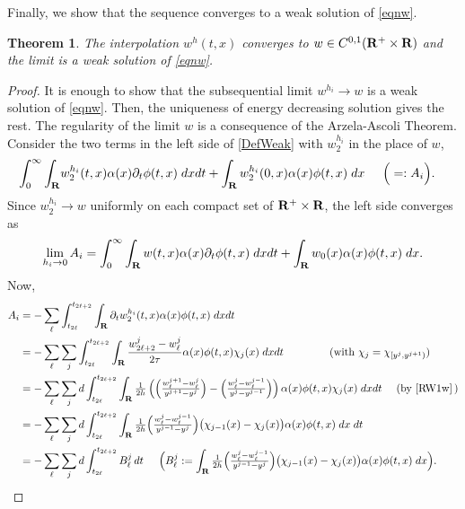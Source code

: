 \documentclass[11pt]{amsart}
\def\R{{\bf R}}
\def\R{\mathbb{R}}
\def\R{{\bf R}}
\newtheorem{theorem}{Theorem}[section]
\begin{document}
Finally, we show that the sequence converges to a weak solution of \eqref{eqnw}.
\begin{theorem}
  The interpolation $w^{h}(t,x)$ converges to $w\in C^{0,1}(\R^+\times\R)$ and the limit is a weak solution of \eqref{eqnw}.
\end{theorem}
\begin{proof}
It is enough to show that the subsequential limit $w^{h_i}\to w$ is a weak solution of \eqref{eqnw}. Then, the uniqueness of energy decreasing solution gives the rest. The regularity of the limit $w$ is a consequence of the Arzela-Ascoli Theorem. Consider the two terms in the left side of \eqref{DefWeak} with $w_2^{h_i}$ in the place of $w$,
\begin{align*}
 \int_0^\infty\int_\R& w_2^{h_i}(t,x) \alpha(x)\partial_t\phi(t,x)\; dx dt
 +\int_\R w_2^{h_i}(0,x)\alpha(x)\phi(t,x) \; dx\hskip 5mm \Big(=:A_i\Big).
\end{align*}
Since $w_2^{h_i} \rightarrow w$ uniformly on each compact set of $\R^+\times \R$, the left side converges as
\begin{align*}
\lim_{h_i\to0}A_i=\int_0^\infty\int_\R w(t,x) \alpha(x)\partial_t\phi(t,x)\; dx
dt+\int_\R w_0(x)\alpha(x)\phi(t,x) \; dx.
\end{align*}
Now,
\begin{align*}
 A_i&=-\sum_{\ell}\int_{t_{2\ell}}^{t_{2\ell+2}}\int_\R \partial_t
 w_2^{h_i}(t,x) \alpha(x)\phi(t,x)\; dx dt \\
 &=-\sum_{\ell}\sum_{j}\int_{t_{2\ell}}^{t_{2\ell+2}}\int_\R
 \frac{w^j_{2\ell+2}-w^j_{\ell}}{2\tau} \alpha(x) \phi(t,x) \chi_j(x)\; dx dt \hskip
 1.5cm (\text{with } \chi_j=\chi_{[y^j,y^{j+1})})\\
 &=-\sum_{\ell}\sum_{j}d\int_{t_{2\ell}}^{t_{2\ell+2}}\int_\R
 \tfrac{1}{2h} \left( \Big(\tfrac{w^{j+1}_{\ell} -
 w^{j}_{\ell}}{y^{j+1}-y^j}\Big) -\Big(\tfrac{w^{j}_{\ell} -
 w^{j-1}_{\ell}}{y^{j}-y^{j-1}} \Big)\right) \alpha(x) \phi(t,x) \chi_j(x)\; dx
 dt\quad\ (\text{by } \eqref{RW1w}\,)\\
 &=-\sum_{\ell}\sum_{j}d\int_{t_{2\ell}}^{t_{2\ell+2}}\int_\R
 \tfrac{1}{2h} \Big(\tfrac{w^{j}_{\ell} -
 w^{j-1}_{\ell}}{y^{j-1}-y^j}\Big)
 \big(\chi_{j-1}(x)-\chi_{j}(x)\big)\alpha(x) \phi(t,x) \; dx \;dt\\
 &=-\sum_{\ell}\sum_{j}d\int_{t_{2\ell}}^{t_{2\ell+2}}B_\ell^j\,dt\hskip 5mm\Big(B_\ell^j:=\int_\R \tfrac{1}{2h} \Big(\tfrac{w^{j}_{\ell} -
w^{j-1}_{\ell}}{y^{j-1}-y^j}\Big)
\big(\chi_{j-1}(x)-\chi_{j}(x)\big)\alpha(x) \phi(t,x) \; dx\Big).
\end{align*}


\end{proof}
\end{document}
